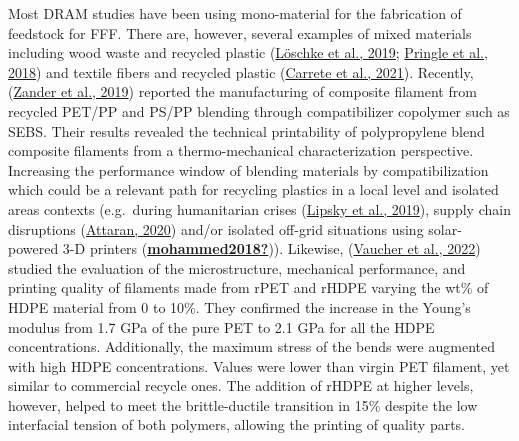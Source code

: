 \documentclass[
  12pt,
  number,
  review]{elsarticle}
\begin{document}
Most DRAM studies have been using mono-material for the fabrication of
feedstock for FFF. There are, however, several examples of mixed
materials including wood waste and recycled plastic
(\protect\hyperlink{ref-loschke2019}{Löschke et al., 2019};
\protect\hyperlink{ref-pringle2018}{Pringle et al., 2018}) and textile
fibers and recycled plastic (\protect\hyperlink{ref-carrete2021}{Carrete
et al., 2021}). Recently, (\protect\hyperlink{ref-Zander2019}{Zander et
al., 2019}) reported the manufacturing of composite filament from
recycled PET/PP and PS/PP blending through compatibilizer copolymer such
as SEBS. Their results revealed the technical printability of
polypropylene blend composite filaments from a thermo-mechanical
characterization perspective. Increasing the performance window of
blending materials by compatibilization which could be a relevant path
for recycling plastics in a local level and isolated areas contexts
(e.g.~during humanitarian crises
(\protect\hyperlink{ref-lipsky2019}{Lipsky et al., 2019}), supply chain
disruptions (\protect\hyperlink{ref-attaran2020}{Attaran, 2020}) and/or
isolated off-grid situations using solar-powered 3-D printers
(\protect\hyperlink{ref-mohammed2018}{\textbf{mohammed2018?}})).
Likewise, (\protect\hyperlink{ref-vaucher2022}{Vaucher et al., 2022})
studied the evaluation of the microstructure, mechanical performance,
and printing quality of filaments made from rPET and rHDPE varying the
wt\% of HDPE material from 0 to 10\%. They confirmed the increase in the
Young's modulus from 1.7 GPa of the pure PET to 2.1 GPa for all the HDPE
concentrations. Additionally, the maximum stress of the bends were
augmented with high HDPE concentrations. Values were lower than virgin
PET filament, yet similar to commercial recycle ones. The addition of
rHDPE at higher levels, however, helped to meet the brittle-ductile
transition in 15\% despite the low interfacial tension of both polymers,
allowing the printing of quality parts.
\end{document}
